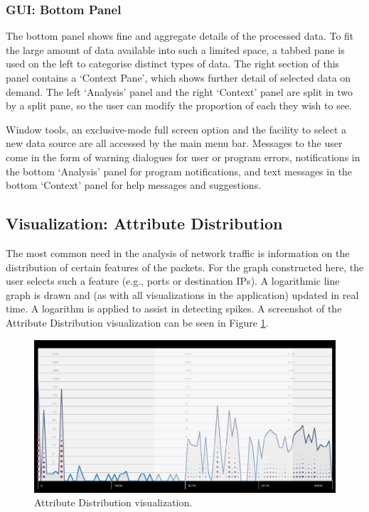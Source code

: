 \subsubsection{GUI: Bottom Panel}
The bottom panel shows fine and aggregate details of the processed data. To fit the large amount of
data available into such a limited space, a tabbed pane is used on the left to categorise distinct
types of data. The right section of this panel contains a `Context Pane', which shows further detail
of selected data on demand. The left `Analysis' panel and the right `Context' panel are split in two
by a split pane, so the user can modify the proportion of each they wish to see.


Window tools, an exclusive-mode full screen option and the facility to select a new data source are
all accessed by the main menu bar. Messages to the user come in the form of warning dialogues for
user or program errors, notifications in the bottom `Analysis' panel for program notifications, and
text messages in the bottom `Context' panel for help messages and suggestions.

\subsection{Visualization: Attribute Distribution}
%
The most common need in the analysis of network traffic is information on the distribution of
certain features of the packets. For the graph constructed here, the user selects such a feature
(e.g., ports or destination IPs). A logarithmic line graph is drawn and (as with all visualizations
in the application) updated in real time. A logarithm is applied to assist in detecting spikes. A
screenshot of the Attribute Distribution visualization can be seen in Figure \ref{fig:distribution}.

\begin{figure}[htb]
   \centering
   \includegraphics[width=\linewidth]{materials/distribution.jpg}
   \caption[Dataflow]{\label{fig:distribution}
         Attribute Distribution visualization.}
\end{figure}

